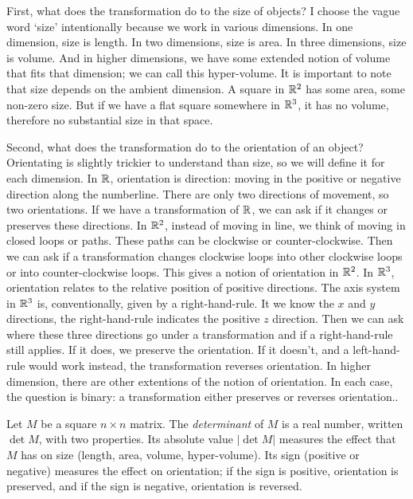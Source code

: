 \documentclass[fleqn,letterpaper]{report}
\begin{document}
First, what does the transformation do to the size of objects?
I choose the vague word `size' intentionally because we work
in various dimensions. In one dimension, size is length. In
two dimensions, size is area. In three dimensions, size is
volume. And in higher dimensions, we have some extended
notion of volume that fits that dimension; we can call this
hyper-volume. It is important to note that size depends on
the ambient dimension. A square in $\mathbb{R}^2$ has some area,
some non-zero size. But if we have a flat square somewhere in
$\mathbb{R}^3$, it has no volume, therefore no substantial size in
that space. 

Second, what does the transformation do to the orientation of
an object? Orientating is slightly trickier to understand
than size, so we will define it for each dimension. In
$\mathbb{R}$, orientation is direction: moving in the positive
or negative direction along the numberline. There are only two
directions of movement, so two orientations. If we have a
transformation of $\mathbb{R}$, we can ask if it changes or preserves
these directions. In $\mathbb{R}^2$, instead of moving in line, we
think of moving in closed loops or paths. These paths can be
clockwise or counter-clockwise. Then we can ask if a
transformation changes clockwise loops into other clockwise
loops or into counter-clockwise loops. This gives a notion of
orientation in $\mathbb{R}^2$. In $\mathbb{R}^3$, orientation relates to
the relative position of positive directions. The axis system
in $\mathbb{R}^3$ is, conventionally, given by a right-hand-rule. It
we know the $x$ and $y$ directions, the right-hand-rule
indicates the positive $z$ direction. Then we can ask where
these three directions go under a transformation and if a
right-hand-rule still applies. If it does, we preserve the
orientation. If it doesn't, and a left-hand-rule would work
instead, the transformation reverses orientation. In higher
dimension, there are other extentions of the notion of
orientation. In each case, the question is binary: a
transformation either preserves or reverses orientation..

\begin{defn}
Let $M$ be a square $n \times n$ matrix. The
\emph{determinant} of $M$ is a real number, written $\det M$,
with two properties. Its absolute value $|\det M|$ measures
the effect that $M$ has on size (length, area, volume,
hyper-volume). Its sign (positive or negative) measures the
effect on orientation; if the sign is positive, orientation is
preserved, and if the sign is negative, orientation is
reversed.
\end{defn}
\end{document}
